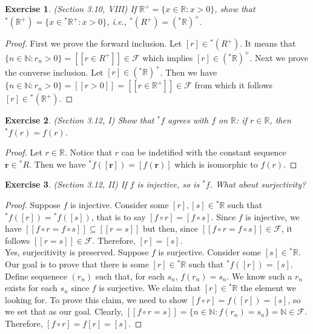 \documentclass[a4paper, 11pt]{book}
\theoremstyle{plain}
\newtheorem{exercise}{Exercise}[chapter]
\theoremstyle{plain}
\newcommand{\mb}{\mathbf}
\newcommand{\mc}{\mathcal}
\newcommand{\N}{\mathbb{N}}
\newcommand{\R}{\mathbb{R}}
\newcommand{\hyp}{{}^*}
\begin{document}
  \begin{exercise}
    (Section 3.10, VIII)
    If $\R^+=\{x \in \R: x>0\}$, show that $\hyp (\R^+)=\{x \in \hyp \R^+:x>0\}$, i.e., $\hyp (R^+)=(\hyp \R)^+$.
  \end{exercise}
  \begin{proof}
    First we prove the forward inclusion. Let $[r] \in \hyp (R^+)$. It means that $\{n \in \N: r_n>0\}=[[r \in R^+]] \in \mc{F}$ which implies $[r] \in (\hyp \R)^+$. Next we prove the converse inclusion. Let $[r] \in (\hyp \R)^+$. Then we have $\{n \in \N: r_n>0\}=[[r>0]]=[[r \in \R^+]] \in \mc{F}$ from which it follows $[r] \in \hyp(\R^+)$.
  \end{proof}

  \begin{exercise}
    (Section 3.12, I)
    Show that $\hyp f$ agrees with $f$ on $\R$: if $r \in \R$, then $\hyp f(r)=f(r)$.
  \end{exercise}
  \begin{proof}
    Let $r \in \R$. Notice that $r$ can be indetified with the constant sequence $\mb{r} \in \hyp R$. Then we have $\hyp f([\mb{r}])=[f(\mb{r})]$ which is isomorphic to $f(r)$.
  \end{proof}
  \begin{exercise}
    (Section 3.12, II)
    If $f$ is injective, so is $\hyp f$. What about surjectivity?
  \end{exercise}
  \begin{proof}
    Suppose $f$ is injective. Consider some $[r], [s] \in \hyp \R$ such that $\hyp f([r])=\hyp f([s])$, that is to say $[f \circ r]=[f \circ s]$. Since $f$ is injective, we have $[[f \circ r=f \circ s]] \subseteq [[r =s]]$ but then, since $[[f \circ r=f \circ s]] \in \mc{F}$, it follows $[[r=s]] \in \mc{F}$. Therefore, $[r]=[s]$. \\

    Yes, surjecitivity is preserved. Suppose $f$ is surjective. Consider some $[s] \in \hyp \R$. Our goal is to prove that there is some $[r] \in \hyp \R$ such that $\hyp f([r])=[s]$. Define sequenece $(r_n)$ such that, for each $s_n$, $f(r_n)=s_n$. We know such a $r_n$ exists for each $s_n$ since $f$ is surjective. We claim that $[r] \in \hyp \R$ the element we looking for. To prove this claim, we need to show $[f \circ r]=f([r])=[s]$, so we set that as our goal. Clearly, $[[f \circ r = s]]=\{n \in \N: f(r_n)=s_n\}=\N \in \mc{F}$. Therefore, $[f \circ r]=f[r] = [s]$. 
  \end{proof}
\end{document}
